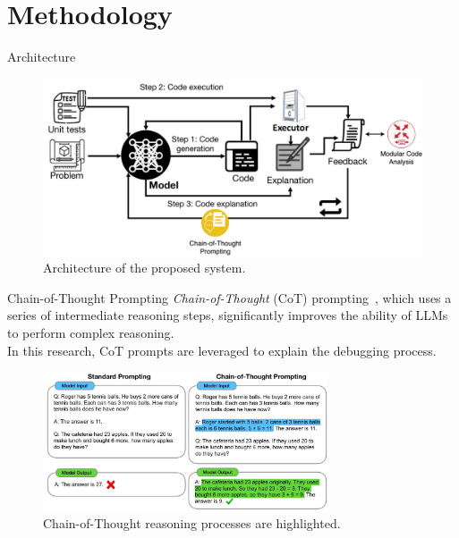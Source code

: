 \section{Methodology}

\begin{frame}{Architecture}
    \begin{figure}[!htb]
        \centering
        \includegraphics[width=1\textwidth]{img/enhanced_self_debug}
        \captionsetup{font=small,labelformat=empty}
        \caption{Architecture of the proposed system.}
    \end{figure}
\end{frame}

\begin{frame}{Chain-of-Thought Prompting}
    \textit{Chain-of-Thought} (CoT) prompting~\cite{wei2023chainofthought}, which uses a series of intermediate reasoning steps, significantly improves the ability of LLMs to perform complex reasoning.\\
    In this research, CoT prompts are leveraged to explain the debugging process.
    \begin{figure}[!htb]
        \centering
        \includegraphics[width=0.75\textwidth]{img/cot_prompting}
        \captionsetup{font=small,labelformat=empty}
        \caption{Chain-of-Thought reasoning processes are highlighted.}
    \end{figure}
\end{frame}

